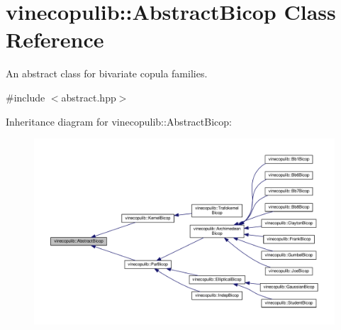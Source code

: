 \hypertarget{classvinecopulib_1_1_abstract_bicop}{}\section{vinecopulib\+:\+:Abstract\+Bicop Class Reference}
\label{classvinecopulib_1_1_abstract_bicop}


An abstract class for bivariate copula families.  




{\ttfamily \#include $<$abstract.\+hpp$>$}



Inheritance diagram for vinecopulib\+:\+:Abstract\+Bicop\+:\nopagebreak
\begin{figure}[H]
\begin{center}
\leavevmode
\includegraphics[width=350pt]{classvinecopulib_1_1_abstract_bicop__inherit__graph}
\end{center}
\end{figure}

